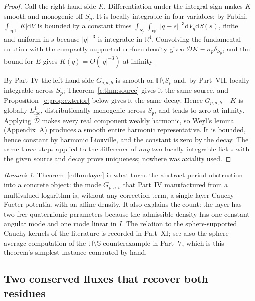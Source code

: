 \documentclass[11pt,a4paper]{article}
\numberwithin{equation}{section}
\theoremstyle{definition}
\theoremstyle{remark}
\newtheorem{remark}[theorem]{Remark}
\theoremstyle{plain}
\newcommand{\HH}{\mathbb H}
\newcommand{\RR}{\mathbb R}
\newcommand{\SSS}{\mathbb S}
\newcommand{\Dop}{\mathcal D}
\newcommand{\Sp}{S_{p}}
\newcommand{\abs}[1]{\lvert #1\rvert}
\newcommand{\dd}{\mathrm d}
\begin{document}
\begin{proof}
Call the right-hand side $K$. Differentiation under the integral sign
makes $K$ smooth and monogenic off $\Sp$. It is locally integrable in
four variables: by Fubini, $\int_{\mathrm{cpt}}\abs K\dd V$ is bounded by
a constant times $\int_{\Sp}\int_{\mathrm{cpt}}\abs{q-s}^{-3}\dd V_q\dd
S(s)$, finite and uniform in $s$ because $\abs q^{-3}$ is integrable in
$\RR^4$. Convolving the fundamental solution with the compactly supported
surface density gives $\Dop K=\sigma_p\delta_{\Sp}$, and the bound for
$E$ gives $K(q)=O(\abs q^{-3})$ at infinity.

By Part~IV the left-hand side $G_{p;a,b}$ is smooth on $\HH\setminus\Sp$
and, by Part~VII, locally integrable across $\Sp$; Theorem~\ref{e:thm:source}
gives it the same source, and Proposition~\ref{e:prop:exterior} below gives
it the same decay. Hence $G_{p;a,b}-K$ is globally $L^1_{\mathrm{loc}}$,
distributionally monogenic across $\Sp$, and tends to zero at infinity.
Applying $\overline{\Dop}$ makes every real component weakly harmonic, so
Weyl's lemma (Appendix~A) produces a smooth entire harmonic
representative. It is bounded, hence constant by harmonic Liouville, and
the constant is zero by the decay. The same three steps applied to the
difference of \emph{any} two locally integrable fields with the given
source and decay prove uniqueness; nowhere was axiality used.
\end{proof}

\begin{remark}
Theorem~\ref{e:thm:layer} is what turns the abstract period obstruction
into a concrete object: the mode $G_{p;a,b}$ that Part~IV manufactured
from a multivalued logarithm is, without any correction term, a
single-layer Cauchy--Fueter potential with an affine density. It also
explains the count: the layer has two free quaternionic parameters
because the admissible density has one constant angular mode and one mode
linear in $I$. The relation to the sphere-supported Cauchy kernels of the
literature is recorded in Part~XI; see also the sphere-average
computation of the $\HH\setminus\SSS$ counterexample in Part~V, which is
this theorem's simplest instance computed by hand.
\end{remark}

\subsection{Two conserved fluxes that recover both residues}
\label{e:sec:fluxes}
\end{document}
